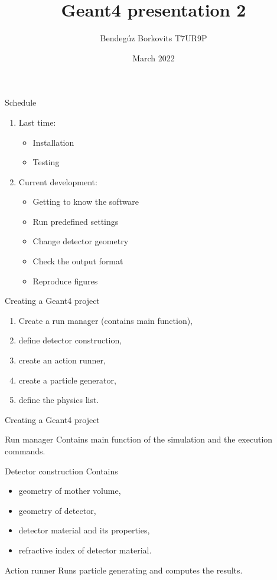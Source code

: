 \documentclass[11pt]{beamer}
\author{Bendegúz Borkovits T7UR9P}
\title{Geant4 presentation 2}
\institute{Scientific Modeling Computer Laboratory}
\date{March 2022}
\begin{document}
\begin{frame}
\titlepage
\end{frame}

\begin{frame}{Schedule}
\begin{center}
\begin{enumerate}
    \item Last time:
    \begin{itemize}
        \item Installation
        \item Testing
    \end{itemize}
    \item Current development:
    \begin{itemize}
        \item Getting to know the software
        \item Run predefined settings
        \item Change detector geometry
        \item Check the output format
        \item Reproduce figures
    \end{itemize}
\end{enumerate}
\end{center}
\end{frame}

\begin{frame}{Creating a Geant4 project}
    \begin{enumerate}
        \item Create a run manager (contains main function),
        \item define detector construction,
        \item create an action runner,
        \item create a particle generator,
        \item define the physics list.
    \end{enumerate}
\end{frame}

\begin{frame}{Creating a Geant4 project}
    \begin{block}{Run manager}
    Contains main function of the simulation and the execution commands.
    \end{block}
    \begin{block}{Detector construction}
    Contains
    \begin{itemize}
        \item geometry of mother volume,
        \item geometry of detector,
        \item detector material and its properties,
        \item refractive index of detector material.
    \end{itemize}
    \end{block}

    \begin{block}{Action runner}
    Runs particle generating and computes the results.
    \end{block}
\end{frame}
\end{document}
